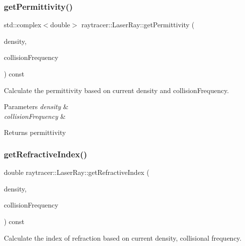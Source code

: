 \subsubsection{\texorpdfstring{get\+Permittivity()}{getPermittivity()}}
{\footnotesize\ttfamily std\+::complex$<$double$>$ raytracer\+::\+Laser\+Ray\+::get\+Permittivity (\begin{DoxyParamCaption}\item[{const \hyperlink{structraytracer_1_1Density}{Density} \&}]{density,  }\item[{const \hyperlink{structraytracer_1_1Frequency}{Frequency} \&}]{collision\+Frequency }\end{DoxyParamCaption}) const\hspace{0.3cm}{\ttfamily [inline]}}



Calculate the permittivity based on current density and collision\+Frequency. 


\begin{DoxyParams}{Parameters}
{\em density} & \\
\hline
{\em collision\+Frequency} & \\
\hline
\end{DoxyParams}
\begin{DoxyReturn}{Returns}
permittivity 
\end{DoxyReturn}
\mbox{\label{classraytracer_1_1LaserRay_af841f0b8279f67242414c1709ce61212}} 
\subsubsection{\texorpdfstring{get\+Refractive\+Index()}{getRefractiveIndex()}}
{\footnotesize\ttfamily double raytracer\+::\+Laser\+Ray\+::get\+Refractive\+Index (\begin{DoxyParamCaption}\item[{const \hyperlink{structraytracer_1_1Density}{Density} \&}]{density,  }\item[{const \hyperlink{structraytracer_1_1Frequency}{Frequency} \&}]{collision\+Frequency }\end{DoxyParamCaption}) const}



Calculate the index of refraction based on current density, collisional frequency. 


